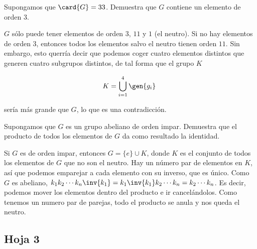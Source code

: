 \begin{problem}[15] Supongamos que $\card{G} = 33$. Demuestra que $G$ contiene un elemento de orden $3$.

\solution $G$ sólo puede tener elementos de orden $3$, $11$ y $1$ (el neutro). Si no hay elementos de orden $3$, entonces todos los elementos salvo el neutro tienen orden $11$. Sin embargo, esto querría decir que podemos coger cuatro elementos distintos que generen cuatro subgrupos distintos, de tal forma que el grupo $K$

\[ K = \bigcup_{i=1}^4 \gen{g_i} \]

sería más grande que $G$, lo que es una contradicción.
\end{problem}

\begin{problem}[18] Supongamos que $G$ es un grupo abeliano de orden impar. Demuestra que el producto de todos los elementos de $G$ da como resultado la identidad.

\solution Si $G$ es de orden impar, entonces $G = \{ e \} \cup K$, donde $K$ es el conjunto de todos los elementos de $G$ que no son el neutro. Hay un número par de elementos en $K$, así que podemos emparejar a cada elemento con su inverso, que es único. Como $G$ es abeliano, $k_1 k_2 \dotsb k_n \inv{k_1} = k_1 \inv{k_1} k_2 \dotsb k_n = k_2 \dotsb k_n$. Es decir, podemos mover los elementos dentro del producto e ir cancelándolos. Como tenemos un numero par de parejas, todo el producto se anula y nos queda el neutro.

\end{problem}

\subsection{Hoja 3}


